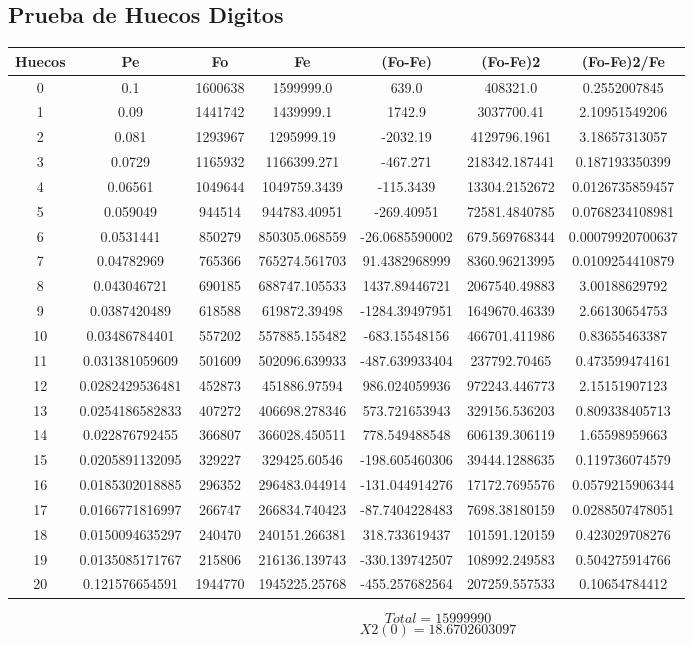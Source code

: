 \documentclass{article}
\begin{document}
\subsection{Prueba de Huecos Digitos}
\begin{tabular}{|c|c|c|c|c|c|c|}
Huecos&Pe&Fo&Fe&(Fo{-}Fe)&(Fo{-}Fe)2&(Fo{-}Fe)2/Fe\\
\hline
0&0.1&1600638&1599999.0&639.0&408321.0&0.2552007845\\
\hline
1&0.09&1441742&1439999.1&1742.9&3037700.41&2.10951549206\\
\hline
2&0.081&1293967&1295999.19&{-}2032.19&4129796.1961&3.18657313057\\
\hline
3&0.0729&1165932&1166399.271&{-}467.271&218342.187441&0.187193350399\\
\hline
4&0.06561&1049644&1049759.3439&{-}115.3439&13304.2152672&0.0126735859457\\
\hline
5&0.059049&944514&944783.40951&{-}269.40951&72581.4840785&0.0768234108981\\
\hline
6&0.0531441&850279&850305.068559&{-}26.0685590002&679.569768344&0.00079920700637\\
\hline
7&0.04782969&765366&765274.561703&91.4382968999&8360.96213995&0.0109254410879\\
\hline
8&0.043046721&690185&688747.105533&1437.89446721&2067540.49883&3.00188629792\\
\hline
9&0.0387420489&618588&619872.39498&{-}1284.39497951&1649670.46339&2.66130654753\\
\hline
10&0.03486784401&557202&557885.155482&{-}683.15548156&466701.411986&0.83655463387\\
\hline
11&0.031381059609&501609&502096.639933&{-}487.639933404&237792.70465&0.473599474161\\
\hline
12&0.0282429536481&452873&451886.97594&986.024059936&972243.446773&2.15151907123\\
\hline
13&0.0254186582833&407272&406698.278346&573.721653943&329156.536203&0.809338405713\\
\hline
14&0.022876792455&366807&366028.450511&778.549488548&606139.306119&1.65598959663\\
\hline
15&0.0205891132095&329227&329425.60546&{-}198.605460306&39444.1288635&0.119736074579\\
\hline
16&0.0185302018885&296352&296483.044914&{-}131.044914276&17172.7695576&0.0579215906344\\
\hline
17&0.0166771816997&266747&266834.740423&{-}87.7404228483&7698.38180159&0.0288507478051\\
\hline
18&0.0150094635297&240470&240151.266381&318.733619437&101591.120159&0.423029708276\\
\hline
19&0.0135085171767&215806&216136.139743&{-}330.139742507&108992.249583&0.504275914766\\
\hline
20&0.121576654591&1944770&1945225.25768&{-}455.257682564&207259.557533&0.10654784412\\
\end{tabular}
$$
Total = 15999990
$$
$$
X2(0) = 18.6702603097
$$
\end{document}
